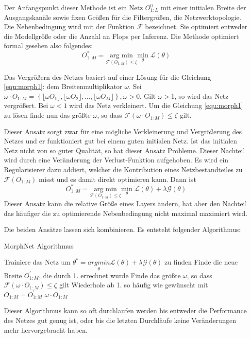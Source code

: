 Der Anfangspunkt dieser Methode ist ein Netz $O_{1:L}^0$ mit einer initialen Breite der Ausgangskanäle sowie fixen Größen für die Filtergrößen, die Netzwerktopologie. Die Nebenbedingung wird mit der Funktion $\mathcal{F}$ bezeichnet. Sie optimiert entweder die Modellgröße oder die Anzahl an Flops per Inferenz. Die Methode optimiert formal gesehen also folgendes:
\begin{equation}
 O^{\ast}_{1:M}= \underset{\mathcal{F}(O_{1:M})\leq \zeta}{\text{arg min}} \underset{\theta}{\text{min}}\; \mathcal{L}(\theta)\label{equ:morph1}
\end{equation}

Das Vergrößern des Netzes basiert auf einer Lösung für die Gleichung \ref{equ:morph1}: dem Breitenmultiplikator $\omega$. 
Sei $\omega \cdot O_{1:M} = \left\{ \lfloor \omega O_1 \rfloor, \lfloor \omega O_2 \rfloor, \ldots , \lfloor \omega O_M \rfloor \right\}, \omega>0$. Gilt $\omega>1$, so wird das Netz vergrößert. Bei $\omega <1$ wird das Netz verkleinert. Um die Gleichung \ref{equ:morph1} zu lösen finde nun das größte $\omega$, so dass $\mathcal{F}(\omega \cdot O_{1:M})\leq \zeta$ gilt.


Dieser Ansatz sorgt zwar für eine mögliche Verkleinerung und Vergrößerung des Netzes und er funktioniert gut bei einem guten initialen Netz. Ist das initialen Netz nicht von so guter Qualität, so hat dieser Ansatz Probleme. 
Dieser Nachteil wird durch eine Veränderung der Verlust-Funktion aufgehoben. Es wird ein Regularisierer dazu addiert, welcher die Kontribution eines Netzbestandteiles zu $\mathcal{F}( O_{1:M})$ misst und es damit direkt optimieren kann. Dann ist
\begin{equation}
 O^{\ast}_{1:M}= \underset{\mathcal{F}(O_{1:M})\leq \zeta}{\text{arg min}} \underset{\theta}{\text{min}}\; \mathcal{L}(\theta) + \lambda \mathcal{G}(\theta)  
 \label{equ:morph2}
\end{equation}
Dieser Ansatz kann die relative Größe eines Layers ändern, hat aber den Nachteil das häufiger die zu optimierende Nebenbedingung nicht maximal maximiert wird.




Die beiden Ansätze lassen sich kombinieren. Es entsteht folgender Algorithmus:
\begin{algorithm}[H]
\caption{MorphNet Algorithmus}
\begin{algorithmic}[1]
\STATE Trainiere das Netz um $\theta^{\ast}=\underset{\theta}{arg min} \mathcal{L}(\theta) + \lambda \mathcal{G}(\theta)$ zu finden
\STATE Finde die neue Breite $O_{1:M}^{\prime}$, die durch 1. errechnet wurde
\STATE Finde das größte $\omega$, so dass $\mathcal{F}(\omega \cdot O_{1:M})\leq \zeta$ gilt
\STATE Wiederhole ab 1. so häufig wie gewünscht mit $O_{1:M} = O_{1:M}^{\prime}$
\ENSURE $\omega \cdot O_{1:M}$
\end{algorithmic}
\label{alg:morphnet}
\end{algorithm}
Dieser Algorithmus kann so oft durchlaufen werden bis entweder die Performance des Netzes gut genug ist, oder bis die letzten Durchläufe keine Veränderungen mehr hervorgebracht haben.


